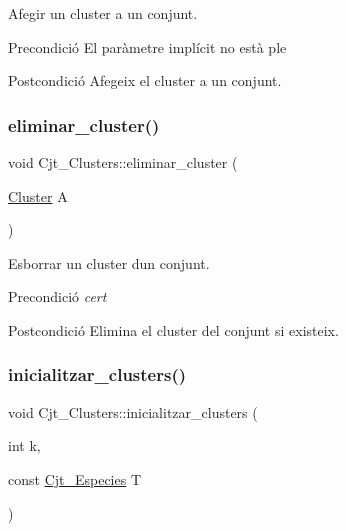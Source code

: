 Afegir un cluster a un conjunt. 

\begin{DoxyPrecond}{Precondició}
El paràmetre implícit no està ple 
\end{DoxyPrecond}
\begin{DoxyPostcond}{Postcondició}
Afegeix el cluster a un conjunt. 
\end{DoxyPostcond}
\mbox{\label{class_cjt___clusters_ae29d4a65bc134e2b23a41802f079ec96}} 
\subsubsection{\texorpdfstring{eliminar\+\_\+cluster()}{eliminar\_cluster()}}
{\footnotesize\ttfamily void Cjt\+\_\+\+Clusters\+::eliminar\+\_\+cluster (\begin{DoxyParamCaption}\item[{\hyperlink{class_cluster}{Cluster}}]{A }\end{DoxyParamCaption})}



Esborrar un cluster d\textquotesingle{}un conjunt. 

\begin{DoxyPrecond}{Precondició}
{\itshape cert} 
\end{DoxyPrecond}
\begin{DoxyPostcond}{Postcondició}
Elimina el cluster del conjunt si existeix. 
\end{DoxyPostcond}
\mbox{\label{class_cjt___clusters_abe1554d9fdd2d6b2e67d9ddd7b316903}} 
\subsubsection{\texorpdfstring{inicialitzar\+\_\+clusters()}{inicialitzar\_clusters()}}
{\footnotesize\ttfamily void Cjt\+\_\+\+Clusters\+::inicialitzar\+\_\+clusters (\begin{DoxyParamCaption}\item[{int}]{k,  }\item[{const \hyperlink{class_cjt___especies}{Cjt\+\_\+\+Especies}}]{T }\end{DoxyParamCaption})}



